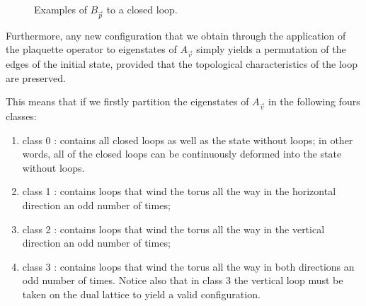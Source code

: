 \documentclass{Configuration_Files/PoliMi3i_thesis}
\begin{document}
\begin{figure}
\begin{center}

	\end{center}

\caption{Examples of $B_{\vec{p}} $ to a closed loop.}
\label{fig:applyBp}
\end{figure}


Furthermore, any new configuration that we obtain through the application of the plaquette operator to eigenstates of $A_{\vec{v}} $ simply yields a permutation of the edges of the initial state, provided that the topological characteristics of the loop are preserved.

This means that if we firstly partition the eigenstates of $A_{\vec{v}} $ in the following fours classes: 

\begin{enumerate}
	\item class 0 : contains all closed loops as well as the state without loops; in other words, all of the closed loops can be continuously deformed into the state without loops.
	
	\item class 1 : contains loops that wind the torus all the way in the horizontal direction an odd number of times;
	
	\item class 2 : contains loops that wind the torus all the way in the vertical direction an odd number of times;
	
	\item class 3 : contains loops that wind the torus all the way in both directions an odd number of times. Notice also  that in class 3 the vertical loop must be taken on the dual lattice to yield a valid configuration.
	
\end{enumerate}
\end{document}
